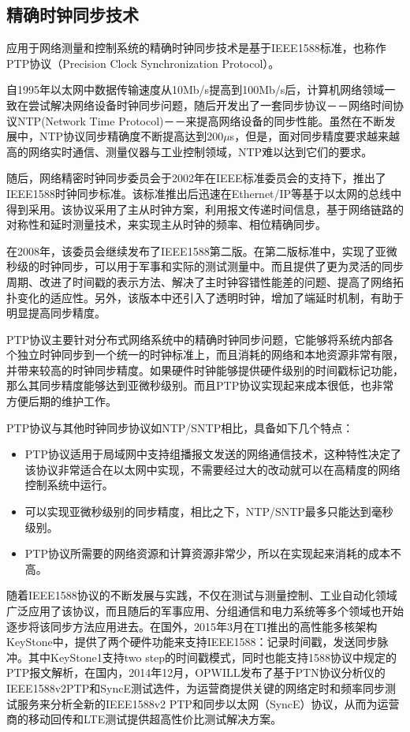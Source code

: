 \subsection{精确时钟同步技术}
应用于网络测量和控制系统的精确时钟同步技术是基于IEEE1588标准，也称作PTP协议（Precision Clock Synchronization Protocol）。

自1995年以太网中数据传输速度从10Mb/s提高到100Mb/s后，计算机网络领域一致在尝试解决网络设备时钟同步问题，随后开发出了一套同步协议－－网络时间协议NTP(Network Time Protocol)－－来提高网络设备的同步性能。虽然在不断发展中，NTP协议同步精确度不断提高达到200$\mu$s，但是，面对同步精度要求越来越高的网络实时通信、测量仪器与工业控制领域，NTP难以达到它们的要求。

随后，网络精密时钟同步委员会于2002年在IEEE标准委员会的支持下，推出了IEEE1588时钟同步标准。该标准推出后迅速在Ethernet/IP等基于以太网的总线中得到采用。该协议采用了主从时钟方案，利用报文传递时间信息，基于网络链路的对称性和延时测量技术，来实现主从时钟的频率、相位精确同步。

在2008年，该委员会继续发布了IEEE1588第二版。在第二版标准中，实现了亚微秒级的时钟同步，可以用于军事和实际的测试测量中。而且提供了更为灵活的同步周期、改进了时间戳的表示方法、解决了主时钟容错性能差的问题、提高了网络拓扑变化的适应性。另外，该版本中还引入了透明时钟，增加了端延时机制，有助于明显提高同步精度。

PTP协议主要针对分布式网络系统中的精确时钟同步问题，它能够将系统内部各个独立时钟同步到一个统一的时钟标准上，而且消耗的网络和本地资源非常有限，并带来较高的时钟同步精度。如果硬件时钟能够提供硬件级别的时间戳标记功能，那么其同步精度能够达到亚微秒级别。而且PTP协议实现起来成本很低，也非常方便后期的维护工作。

PTP协议与其他时钟同步协议如NTP/SNTP相比，具备如下几个特点：
\begin{itemize}[noitemsep,topsep=0pt,parsep=0pt,partopsep=0pt]
	\item PTP协议适用于局域网中支持组播报文发送的网络通信技术，这种特性决定了该协议非常适合在以太网中实现，不需要经过大的改动就可以在高精度的网络控制系统中运行。
	\item 可以实现亚微秒级别的同步精度，相比之下，NTP/SNTP最多只能达到毫秒级别。
	\item PTP协议所需要的网络资源和计算资源非常少，所以在实现起来消耗的成本不高。
\end{itemize}

随着IEEE1588协议的不断发展与实践，不仅在测试与测量控制、工业自动化领域广泛应用了该协议，而且随后的军事应用、分组通信和电力系统等多个领域也开始逐步将该同步方法应用进去。在国外，2015年3月在TI推出的高性能多核架构KeyStone中，提供了两个硬件功能来支持IEEE1588：记录时间戳，发送同步脉冲。其中KeyStone1支持two step的时间戳模式，同时也能支持1588协议中规定的PTP报文解析，在国内，2014年12月，OPWILL发布了基于PTN协议分析仪的IEEE1588v2PTP和SyncE测试选件，为运营商提供关键的网络定时和频率同步测试服务来分析全新的IEEE1588v2 PTP和同步以太网（SyncE）协议，从而为运营商的移动回传和LTE测试提供超高性价比测试解决方案。

